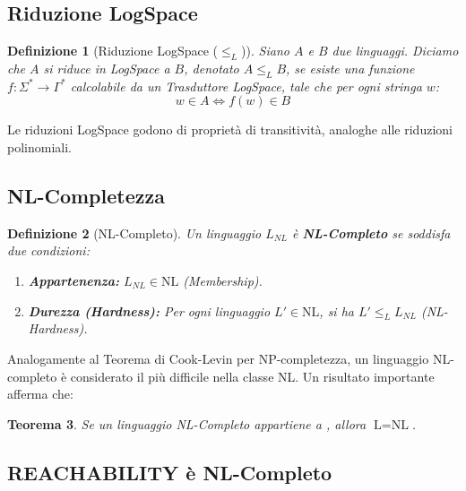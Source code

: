 \documentclass[a4paper, 11pt]{book} %
\newtheorem{theorem}{Teorema}[section]
\newtheorem{definition}[theorem]{Definizione}
\theoremstyle{definition}
\begin{document}
\subsection{Riduzione LogSpace}

\begin{definition}[Riduzione LogSpace ($\le_L$)]
Siano $A$ e $B$ due linguaggi. Diciamo che $A$ si riduce in LogSpace a $B$, denotato $A \le_L B$, se esiste una funzione $f: \Sigma^* \to \Gamma^*$ calcolabile da un Trasduttore LogSpace, tale che per ogni stringa $w$:
\[ w \in A \iff f(w) \in B \]
\end{definition}
Le riduzioni LogSpace godono di proprietà di transitività, analoghe alle riduzioni polinomiali.

\subsection{NL-Completezza}

\begin{definition}[NL-Completo]
Un linguaggio $L_{NL}$ è \textbf{NL-Completo} se soddisfa due condizioni:
\begin{enumerate}
    \item \textbf{Appartenenza:} $L_{NL} \in \text{NL}$ (Membership).
    \item \textbf{Durezza (Hardness):} Per ogni linguaggio $L' \in \text{NL}$, si ha $L' \le_L L_{NL}$ (NL-Hardness).
\end{enumerate}
\end{definition}
Analogamente al Teorema di Cook-Levin per NP-completezza, un linguaggio NL-completo è considerato il più difficile nella classe NL. Un risultato importante afferma che:
\begin{theorem}
Se un linguaggio NL-Completo appartiene a , allora $\text{L} = \text{NL}$.
\end{theorem}

\subsection{REACHABILITY è NL-Completo}
\end{document}
